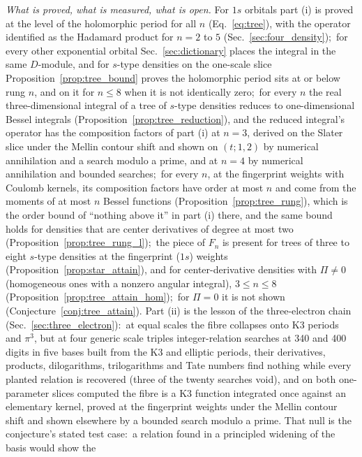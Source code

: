 \documentclass[aps,pra,twocolumn,superscriptaddress,longbibliography]{revtex4-2}
\begin{document}
\emph{What is proved, what is measured, what is open.}  For $1s$ orbitals
part (i) is proved at the level of the holomorphic period for all $n$
(Eq.~\eqref{eq:tree}), with the operator identified as the Hadamard product
for $n=2$ to $5$ (Sec.~\ref{sec:four_density});\ for every other exponential
orbital Sec.~\ref{sec:dictionary} places the integral in the same $D$-module,
and for $s$-type densities on the one-scale slice
Proposition~\ref{prop:tree_bound} proves the holomorphic period sits at or
below rung $n$, and on it for $n\le8$ when it is not identically zero;\ for every $n$ the
real three-dimensional integral of a tree of $s$-type densities reduces to
one-dimensional Bessel integrals
(Proposition~\ref{prop:tree_reduction}), and the reduced integral's operator
has the composition factors of part (i) at $n=3$, derived on the
Slater slice under the Mellin contour shift and shown on $(t;1,2)$ by
numerical annihilation and a search modulo a prime, and at $n=4$ by
numerical annihilation and bounded searches;\ for every $n$, at the
fingerprint weights with Coulomb kernels, its composition factors have order
at most $n$ and come from the moments of at most $n$ Bessel functions
(Proposition~\ref{prop:tree_rung}), which is the order bound of ``nothing above
it'' in part (i) there, and the same bound holds for densities that are center
derivatives of degree at most two (Proposition~\ref{prop:tree_rung_l});\ the piece of $F_n$ is present for trees of three to eight $s$-type densities at the fingerprint ($1s$) weights (Proposition~\ref{prop:star_attain}), and for center-derivative densities with $\Pi\neq0$ (homogeneous ones with a nonzero angular integral), $3\le n\le8$
(Proposition~\ref{prop:tree_attain_hom});\ for $\Pi=0$ it is not shown
(Conjecture~\ref{conj:tree_attain}).  Part (ii) is the lesson of the three-electron chain
(Sec.~\ref{sec:three_electron}):\ at equal scales the fibre collapses onto
K3 periods and $\pi^3$, but at four generic scale triples integer-relation
searches at 340 and 400 digits in five bases built from the K3 and elliptic
periods, their derivatives, products, dilogarithms, trilogarithms and Tate
numbers find nothing while every planted relation is recovered (three of
the twenty searches void), and on both one-parameter slices computed the
fibre is a K3 function integrated once against an elementary kernel, proved
at the fingerprint weights under the Mellin contour shift and shown elsewhere
by a bounded search modulo a prime.  That null is the conjecture's stated test
case:\ a relation found in a principled widening of the basis would show the
\end{document}
